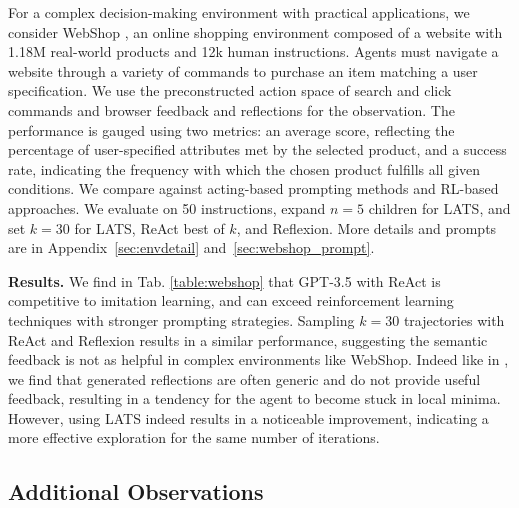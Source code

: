 \documentclass{article} \usepackage{iclr2024_conference,times}
\begin{document}
For a complex decision-making environment with practical applications, we consider WebShop \citep{yao2022webshop}, an online shopping environment composed of a website with 1.18M real-world products and 12k human instructions. Agents must navigate a website through a variety of commands to purchase an item matching a user specification. We use the preconstructed action space of search and click commands and browser feedback and reflections for the observation. The performance is gauged using two metrics: an average score, reflecting the percentage of user-specified attributes met by the selected product, and a success rate, indicating the frequency with which the chosen product fulfills all given conditions. We compare against acting-based prompting methods and RL-based approaches. We evaluate on 50 instructions, expand $n=5$ children for LATS, and set $k=30$ for LATS, ReAct best of $k$, and Reflexion. More details and prompts are in Appendix~\ref{sec:envdetail} and~\ref{sec:webshop_prompt}.

\textbf{Results.} We find in Tab. \ref{table:webshop} that GPT-3.5 with ReAct is competitive to imitation learning, and can exceed reinforcement learning techniques with stronger prompting strategies. Sampling $k=30$ trajectories with ReAct and Reflexion results in a similar performance, suggesting the semantic feedback is not as helpful in complex environments like WebShop. Indeed like in \citet{shinn2023reflexion}, we find that generated reflections are often generic and do not provide useful feedback, resulting in a tendency for the agent to become stuck in local minima. However, using LATS indeed results in a noticeable improvement, indicating a more effective exploration for the same number of iterations.

\subsection{Additional Observations}
\end{document}

